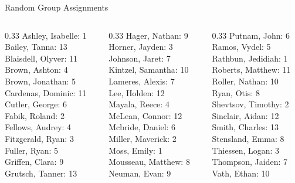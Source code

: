 \documentclass[dvipsnames, 10pt]{beamer}
\begin{document}
\begin{frame}{Random Group Assignments}
\begin{columns}
\begin{column}{0.33\textwidth}
Ashley, Isabelle: 1 \\ 
Bailey, Tanna: 13 \\ 
Blaisdell, Olyver: 11 \\ 
Brown, Ashton: 4 \\ 
Brown, Jonathan: 5 \\ 
Cardenas, Dominic: 11 \\ 
Cutler, George: 6 \\ 
Fabik, Roland: 2 \\ 
Fellows, Audrey: 4 \\ 
Fitzgerald, Ryan: 3 \\ 
Fuller, Ryan: 5 \\ 
Griffen, Clara: 9 \\ 
Grutsch, Tanner: 13 \\\end{column}
\begin{column}{0.33\textwidth}
Hager, Nathan: 9 \\ 
Horner, Jayden: 3 \\ 
Johnson, Jaret: 7 \\ 
Kintzel, Samantha: 10 \\ 
Lameres, Alexis: 7 \\ 
Lee, Holden: 12 \\ 
Mayala, Reece: 4 \\ 
McLean, Connor: 12 \\ 
Mcbride, Daniel: 6 \\ 
Miller, Maverick: 2 \\ 
Moss, Emily: 1 \\ 
Mousseau, Matthew: 8 \\ 
Neuman, Evan: 9 \\\end{column}
\begin{column}{0.33\textwidth}
Putnam, John: 6 \\ 
Ramos, Vydel: 5 \\ 
Rathbun, Jedidiah: 1 \\ 
Roberts, Matthew: 11 \\ 
Roller, Nathan: 10 \\ 
Ryan, Otis: 8 \\ 
Shevtsov, Timothy: 2 \\ 
Sinclair, Aidan: 12 \\ 
Smith, Charles: 13 \\ 
Stensland, Emma: 8 \\ 
Thiessen, Logan: 3 \\ 
Thompson, Jaiden: 7 \\ 
Vath, Ethan: 10 \\\end{column}
\end{columns}
\end{frame}
\end{document}
